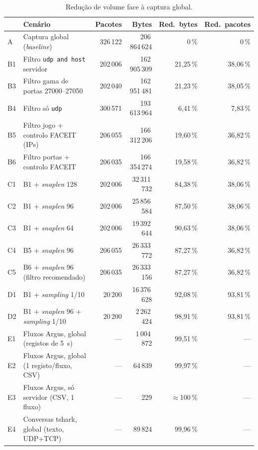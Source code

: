 \documentclass[10.5pt,a4paper]{article}
\begin{document}
\begin{table}[htbp]
\centering
\caption{Redução de volume face à captura global.}\label{tab:red}
\small
\begin{tabular}{@{}llrrrr@{}}
\toprule
 & Cenário & Pacotes & Bytes & Red.\ bytes & Red.\ pacotes\\
\midrule
A  & Captura global (\emph{baseline})                      & 326\,122 & 206\,864\,624 & 0\,\%     & 0\,\%\\
B1 & Filtro \texttt{udp and host} servidor                 & 202\,006 & 162\,905\,309 & 21,25\,\% & 38,06\,\%\\
B3 & Filtro gama de portas 27000--27050                    & 202\,040 & 162\,951\,481 & 21,23\,\% & 38,05\,\%\\
B4 & Filtro só \texttt{udp}                                & 300\,571 & 193\,613\,964 &  6,41\,\% &  7,83\,\%\\
B5 & Filtro jogo + controlo FACEIT (IPs)                   & 206\,055 & 166\,312\,206 & 19,60\,\% & 36,82\,\%\\
B6 & Filtro portas + controlo FACEIT                       & 206\,035 & 166\,354\,274 & 19,58\,\% & 36,82\,\%\\
C1 & B1 + \emph{snaplen} 128                               & 202\,006 &  32\,311\,732 & 84,38\,\% & 38,06\,\%\\
C2 & B1 + \emph{snaplen} 96                                & 202\,006 &  25\,856\,584 & 87,50\,\% & 38,06\,\%\\
C3 & B1 + \emph{snaplen} 64                                & 202\,006 &  19\,392\,644 & 90,63\,\% & 38,06\,\%\\
C4 & B5 + \emph{snaplen} 96                                & 206\,055 &  26\,333\,772 & 87,27\,\% & 36,82\,\%\\
C5 & B6 + \emph{snaplen} 96 (filtro recomendado)           & 206\,035 &  26\,333\,156 & 87,27\,\% & 36,82\,\%\\
D1 & B1 + \emph{sampling} 1/10                             &  20\,200 &  16\,376\,628 & 92,08\,\% & 93,81\,\%\\
D2 & B1 + \emph{snaplen} 96 + \emph{sampling} 1/10         &  20\,200 &   2\,262\,424 & 98,91\,\% & 93,81\,\%\\
E1 & Fluxos Argus, global (registos de 5~s)                & --- &  1\,004\,872 & 99,51\,\% & ---\\
E2 & Fluxos Argus, global (1 registo/fluxo, CSV)           & --- &     64\,839 & 99,97\,\% & ---\\
E3 & Fluxos Argus, só servidor (CSV, 1 fluxo)              & --- &        229 & $\approx$100\,\% & ---\\
E4 & Conversas tshark, global (texto, UDP+TCP)             & --- &     89\,824 & 99,96\,\% & ---\\
\bottomrule
\end{tabular}
\end{table}
\end{document}
